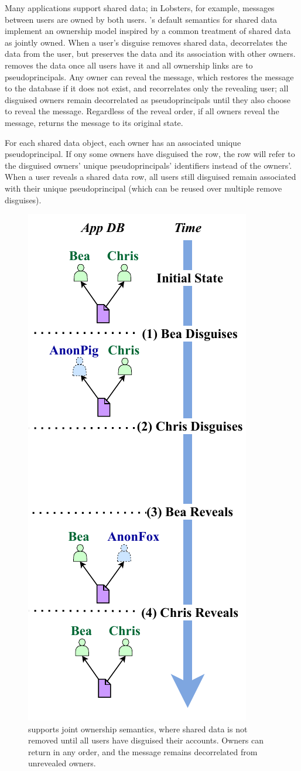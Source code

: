 %
Many applications support shared data; in Lobsters, for example, messages
between users are owned by both users.
%
\sys's default semantics for shared data implement an ownership model inspired
by a common treatment of shared data as jointly owned.
%
When a user's disguise removes shared data, \sys decorrelates the data from the \xxing user,
but preserves the data and its association with other owners.
%
\sys removes the data once all users have \xxed it and all ownership links are
to pseudoprincipals.
%
Any owner can reveal the message, which restores the message to the database if
it does not exist, and recorrelates only the revealing user; all disguised
owners remain decorrelated as pseudoprincipals until they also choose to reveal
the message.
%
Regardless of the reveal order, if all owners reveal the message, \sys returns
the message to its original state.
%

%
For each shared data object, each owner has an associated unique
pseudoprincipal. If ony some owners have disguised the row, the row will refer
to the disguised owners' unique pseudoprincipals' identifiers instead of the
owners'.
%
When a user reveals a shared data row, all users still disguised remain 
associated with their unique pseudoprincipal (which can be reused over
multiple remove disguises).
%

\begin{figure}
    \centering
    \includegraphics[width=.4\textwidth]{figs/shared_hl}
    \caption[\sys supports joint ownership semantics when disguising shared data.]{\sys supports joint ownership semantics, where shared data is not
    removed until all users have disguised their accounts. Owners can return in
    any order, and the message remains decorrelated from unrevealed owners.}
\label{f:shared:hl}
\end{figure}

